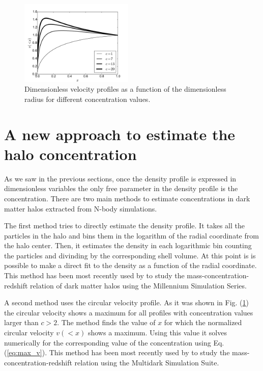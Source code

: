 \documentclass[useAMS,usenatbib]{mn2e}
\begin{document}
\begin{figure}
\begin{center}
  \includegraphics[width=0.48\textwidth]{vel_normalized.pdf}
\end{center}
\caption{Dimensionless velocity profiles as a function of the
  dimensionless radius for different concentration values.
    \label{fig:velocity}}
\end{figure}

\section{A new approach to estimate the halo concentration}
\label{sec:method}

As we saw in the previous sections, once the density profile is
expressed in dimensionless variables the only free parameter in the
density profile  is the concentration. There are two main methods to
estimate concentrations in dark matter halos extracted from N-body
simulations.

The first method tries to directly estimate the density profile.
It takes all the particles in the halo and bins them in the logarithm
of the radial coordinate from the halo center.
Then, it estimates the density in each logarithmic bin counting the
particles and divinding by the corresponding shell volume.
At this point is is possible to make a direct fit to the density as a
function of the radial coordinate.
This method has been most recently used by \cite{Ludlow2014} to study
the mass-concentration-redshift relation of dark matter halos using
the Millennium Simulation Series.

A second method uses the circular velocity profile.
As it was shown in Fig. (\ref{fig:velocity}) the circular velocity
shows a maximum for all profiles with concentration values larger than
$c>2$.
The method finds the value of $x$ for which the normalized circular
velocity $v(<x)$ shows a maximum.
Using this value it solves numerically for the corresponding value of
the concentration using Eq. (\ref{eq:max_v}).
This method has been most recently used by \cite{Klypin2014} to study
the mass-concentration-redshift relation using the Multidark
Simulation Suite.
\end{document}
